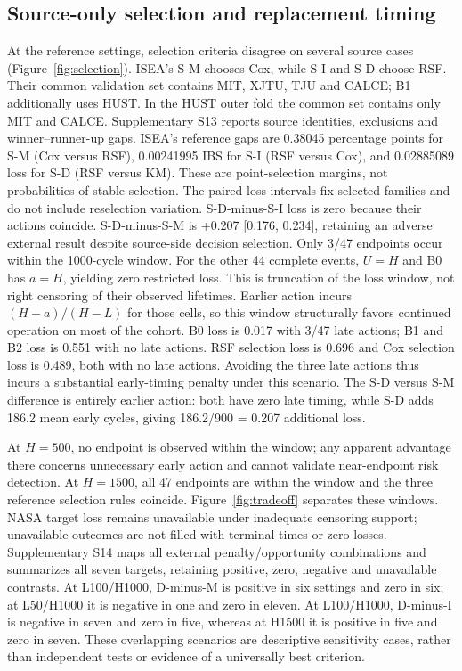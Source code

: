 \documentclass[preprint,12pt]{elsarticle}
\begin{document}
\subsection{Source-only selection and replacement timing}
At the reference settings, selection criteria disagree on several source cases (Figure~\ref{fig:selection}). ISEA's S-M chooses Cox, while S-I and S-D choose RSF. Their common validation set contains MIT, XJTU, TJU and CALCE; B1 additionally uses HUST. In the HUST outer fold the common set contains only MIT and CALCE. Supplementary S13 reports source identities, exclusions and winner--runner-up gaps. ISEA's reference gaps are 0.38045 percentage points for S-M (Cox versus RSF), 0.00241995 IBS for S-I (RSF versus Cox), and 0.02885089 loss for S-D (RSF versus KM). These are point-selection margins, not probabilities of stable selection. The paired loss intervals fix selected families and do not include reselection variation. S-D-minus-S-I loss is zero because their actions coincide. S-D-minus-S-M is +0.207 [0.176, 0.234], retaining an adverse external result despite source-side decision selection. Only 3/47 endpoints occur within the 1000-cycle window. For the other 44 complete events, $U=H$ and B0 has $a=H$, yielding zero restricted loss. This is truncation of the loss window, not right censoring of their observed lifetimes. Earlier action incurs $(H-a)/(H-L)$ for those cells, so this window structurally favors continued operation on most of the cohort. B0 loss is 0.017 with 3/47 late actions; B1 and B2 loss is 0.551 with no late actions. RSF selection loss is 0.696 and Cox selection loss is 0.489, both with no late actions. Avoiding the three late actions thus incurs a substantial early-timing penalty under this scenario. The S-D versus S-M difference is entirely earlier action: both have zero late timing, while S-D adds 186.2 mean early cycles, giving 186.2/900 = 0.207 additional loss.

At $H=500$, no endpoint is observed within the window; any apparent advantage there concerns unnecessary early action and cannot validate near-endpoint risk detection. At $H=1500$, all 47 endpoints are within the window and the three reference selection rules coincide. Figure~\ref{fig:tradeoff} separates these windows. NASA target loss remains unavailable under inadequate censoring support; unavailable outcomes are not filled with terminal times or zero losses. Supplementary S14 maps all external penalty/opportunity combinations and summarizes all seven targets, retaining positive, zero, negative and unavailable contrasts. At L100/H1000, D-minus-M is positive in six settings and zero in six; at L50/H1000 it is negative in one and zero in eleven. At L100/H1000, D-minus-I is negative in seven and zero in five, whereas at H1500 it is positive in five and zero in seven. These overlapping scenarios are descriptive sensitivity cases, rather than independent tests or evidence of a universally best criterion.
\end{document}
